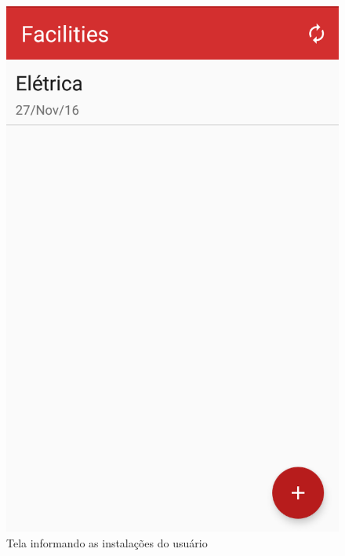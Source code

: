 \begin{figure}[H]
  \hfill
  \begin{minipage}[b]{0.4\textwidth}
    \includegraphics[width=\textwidth]{imagens/screenshots/facilities.png}
    \caption{Tela informando as instalações do usuário}
  \end{minipage}
\end{figure}

